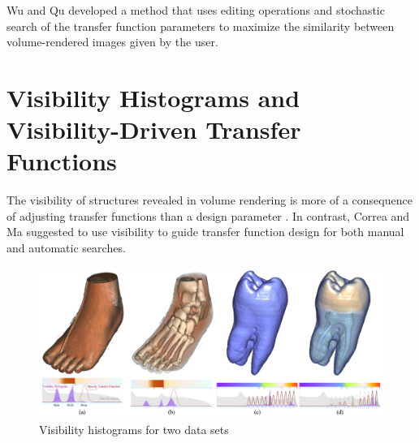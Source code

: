 \cite{tzeng_novel_2003}
\cite{tzeng_cluster-space_2004}
\cite{tzeng_intelligent_2005}

\cite{jani_opacity_2005}

Wu and Qu \cite{wu_interactive_2007} developed a method that uses editing operations and stochastic search of the transfer function parameters to maximize the similarity between volume-rendered images given by the user.

\cite{wang_efficient_volume_2011}

\cite{zhou_automatic_2009}

\cite{marchesin_per-pixel_2010}

\cite{peng_optimal_2011}
\cite{lathen_automatic_2012}

\cite{woo_feature-driven_2012}

\cite{jung_opacity-driven_2014}

\cite{alper_selver_semiautomatic_2009}


\section{Visibility Histograms and Visibility-Driven Transfer Functions}
\cite{jung_dual-modal_2012}
\cite{schlegel_visibility-difference_2013}

The visibility of structures revealed in volume rendering is more of a consequence of adjusting transfer functions than a design parameter \cite{preim_visual_2013}. In contrast, Correa and Ma \cite{correa_visibility-driven_2009} suggested to use visibility to guide transfer function design for both manual and automatic searches.

\begin{figure}
\centering
\includegraphics[width=1\linewidth]{images/correa_visibility-driven_2009}
\caption{Visibility histograms for two data sets \cite{correa_visibility-driven_2009}}
\label{fig:correa_visibility-driven_2009}
\end{figure}


